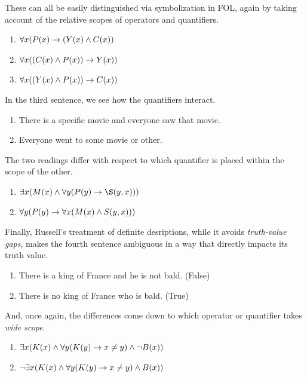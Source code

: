 These can all be easily distinguished via symbolization in FOL, again by
taking account of the relative scopes of operators and quantifiers.

\begin{enumerate}
\item $\forall x(P(x)\rightarrow(Y(x)\wedge C(x))$ 
\item $\forall x((C(x)\wedge P(x))\rightarrow Y(x))$ 
\item $\forall x((Y(x)\wedge P(x))\rightarrow C(x))$ 
\end{enumerate}

In the third sentence, we see how the quantifiers interact. 

\begin{enumerate}
\item There is a specific movie and everyone saw that movie.
\item Everyone went to some movie or other.
\end{enumerate}

The two readings differ with respect to which quantifier is placed within the
scope of the other.

\begin{enumerate}
\item $\eexists x(M(x)\eand\eforall y(P(y)\eif\S(y,x)))$
\item $\forall y(P(y)\rightarrow\forall x(M(x)\wedge S(y,x)))$
\end{enumerate}

Finally, Russell's treatment of definite desriptions, while it avoids
\emph{truth-value gaps}, makes the fourth sentence ambiguous in a way that
directly impacts its truth value.

\begin{enumerate}
\item There is a king of France and he is not bald. (False)
\item There is no king of France who is bald. (True)
\end{enumerate}

And, once again, the differences come down to which operator or quantifier
takes \emph{wide scope}. 

\begin{enumerate}
\item $\exists x(K(x)\wedge\forall y(K(y)\rightarrow x\neq y)\wedge\neg B(x))$
\item $\neg\exists x(K(x)\wedge\forall y(K(y)\rightarrow x\neq y)\wedge B(x))$
\end{enumerate}

